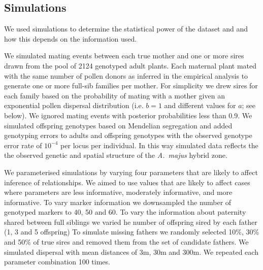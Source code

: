 \documentclass[10pt, a4paper, twocolumn]{article} %
\begin{document}


\subsection{Simulations}

We used simulations to determine the statistical power of the dataset and and how this depends on the information used.

We simulated mating events between each true mother and one or more sires drawn from the pool of 2124 genotyped adult plants.
Each maternal plant mated with the same number of pollen donors as inferred in the empirical analysis to generate one or more full-sib families per mother.
For simplicity we drew sires for each family based on the probability of mating with a mother given an exponential pollen dispersal distribution (i.e. $b=1$ and different values for $a$; see below).
We ignored mating events with posterior probabilities less than 0.9.
We simulated offspring genotypes based on Mendelian segregation and added genotyping errors to adults and offspring genotypes with the observed genotype error rate of $10^{-4}$ per locus per individual.
In this way simulated data reflects the the observed genetic and spatial structure of the \textit{A.~majus} hybrid zone.

We parameterised simulations by varying four parameters that are likely to affect inference of relationships.
We aimed to use values that are likely to affect cases where parameters are less informative, moderately informative, and more informative.
To vary marker information we downsampled the number of genotyped markers to 40, 50 and 60.
To vary the information about paternity shared between full siblings we varied he number of offspring sired by each father (1, 3 and 5 offspring)
To simulate missing fathers we randomly selected 10\%, 30\% and 50\% of true sires and removed them from the set of candidate fathers.
We simulated dispersal with mean distances of 3m, 30m and 300m.
We repeated each parameter combination 100 times.
\end{document}
